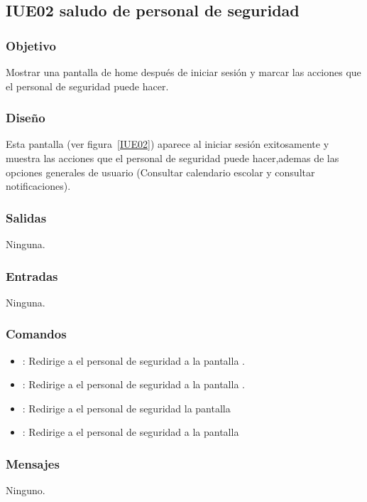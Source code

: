 \subsection{IUE02 saludo de personal de seguridad}

\subsubsection{Objetivo}
Mostrar una pantalla de home después de iniciar sesión y marcar las acciones que el personal de seguridad puede hacer.

\subsubsection{Diseño}
Esta pantalla  (ver figura~\ref{IUE02}) aparece al iniciar sesión exitosamente y muestra las acciones que el personal de seguridad puede hacer,ademas de las opciones generales de usuario (Consultar calendario escolar y consultar notificaciones). 


\subsubsection{Salidas}

Ninguna.

\subsubsection{Entradas}
Ninguna.

\subsubsection{Comandos}
\begin{itemize}
	\item {}: Redirige a el personal de seguridad a la pantalla .
	
	\item {}: Redirige a el personal de seguridad a la pantalla .
	
	\item {}: Redirige a el personal de seguridad la pantalla 
	
	\item {}: Redirige a el personal de seguridad a la pantalla 
	
\end{itemize}

\subsubsection{Mensajes}

\begin{Citemize}
	\item Ninguno.
\end{Citemize}

